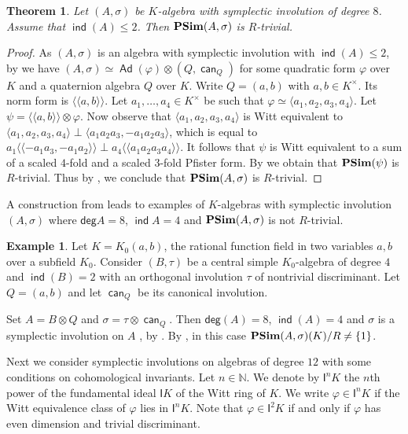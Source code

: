 \documentclass[twoside,11pt]{amsart}
\numberwithin{equation}{section}
\newtheorem{thm}[equation]{Theorem}
\theoremstyle{definition}
\newtheorem{ex}[equation]{Example}
\renewcommand{\deg}{\operatorname{\mathsf{deg}}}
\newcommand\ind{\operatorname{\mathsf{ind}}}
\newcommand{\can}{\operatorname{\mathsf{can}}}
\newcommand{\vf}{\varphi}
\newcommand{\mg}[1]{{#1}^{\times}}
\newcommand{\s}{\sigma}
\newcommand{\nat}{\mathbb{N}}
\newcommand{\la}{\langle}
\newcommand{\ra}{\rangle}
\newcommand{\lla}{\la\!\la}
\newcommand{\rra}{\ra\!\ra}
\renewcommand{\leq}{\leqslant}
\newcommand\Ad{\operatorname{\mathsf{Ad}}}
\newcommand{\I}{\mathsf{I}}
\renewcommand{\deg}{\mathsf{deg}}
\renewcommand{\leq}{\leqslant}
\begin{document}
\begin{thm}\label{4}
    Let $(A,\s)$ be $K$-algebra with symplectic involution of degree $8$. Assume that $\ind(A)\leq 2$. Then ${\bf PSim}(A,\s)$ is $R$-trivial.
\end{thm}

\begin{proof}
As $(A,\s)$ is an algebra with symplectic involution with $\ind(A)\leq 2$, by \cite[Prop. 3.4]{BU18} we have $(A,\s)\simeq \Ad(\vf)\otimes (Q,\can_Q)$ for some quadratic form $\vf$ over $K$ and a quaternion algebra $Q$ over $K$. Write $Q=(a,b)$ with $a,b\in\mg{K}$. 
Its norm form is $\lla a,b\rra$.
Let $a_1,\dots,a_4\in\mg{K}$ be such that $\vf\simeq \la a_1,a_2,a_3,a_4\ra$.
Let $\psi=\lla a, b \rra \otimes \vf$. Now observe that $\la a_1, a_2, a_3, a_4\ra$ is Witt equivalent to $\la a_1, a_2, a_3, a_4\ra\perp \la a_1a_2a_3,-a_1a_2a_3\ra$, which is equal to $a_1\lla -a_1a_3,-a_1a_2\rra\perp a_4\lla a_1a_2a_3a_4\rra$. It follows that $\psi$ is Witt equivalent to a sum of a scaled $4$-fold and a scaled $3$-fold Pfister form. By \cite[Theorem 3.5] {AB25} we obtain that ${\bf PSim}(\psi)$ is $R$-trivial. Thus by , we conclude that ${\bf PSim}(A,\s)$ is $R$-trivial.
\end{proof}

A construction from \cite{BMT04} leads to examples of $K$-algebras with symplectic involution $(A,\s)$ where $\deg A=8$, $\ind A=4$ and ${\bf PSim}(A,\s)$ is not $R$-trivial.

\begin{ex}\label{8-odd multiple}
   Let $K=K_0(a,b)$, the rational function field in two variables $a,b$ over a subfield $K_0$.
   Consider $(B,\tau)$ be a central simple $K_0$-algebra of degree $4$ and $\ind(B)=2$ with an orthogonal involution $\tau$ of nontrivial discriminant. Let $Q=(a,b)$ and let $\can_Q$ be its canonical involution.
  
   Set $A=B\otimes Q$ and $\s=\tau\otimes \can_Q$. 
   Then $\deg(A)=8$, $\ind(A)= 4$ and $\s$ is a symplectic involution on $A$ , by \cite[Prop.~2.23]{KMRT98}. 
   By \cite[Cor.~9]{BMT04}, in this case ${\bf PSim}(A,\s)(K)/R\neq \{1\}$.
\end{ex}



Next we consider symplectic involutions on algebras of degree $12$ with some conditions on cohomological invariants. Let $n\in\nat$. 
We denote by $\I^nK$ the $n$th power of the fundamental ideal $\I K$ of the Witt ring of $K$.
We write $\vf\in\I^n K$ if the Witt equivalence class of $\vf$ lies in $\I^n K$.
Note that $\vf\in\I^2K$ if and only if $\vf$ has even dimension and trivial discriminant. 
\end{document}
